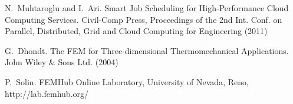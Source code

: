 
\begin{thebibliography}{10}

{\sc N.~Muhtaroglu and I.~Ari}. {Smart Job Scheduling for High-Performance Cloud Computing Services}. Civil-Comp Press, Proceedings of the 2nd Int. Conf. on
Parallel, Distributed, Grid and Cloud Computing for Engineering (2011)

{\sc G.~Dhondt}. {The FEM for Three-dimensional Thermomechanical Applications}. John Wiley \& Sons Ltd. (2004)

{\sc P.~Solin}. {FEMHub Online Laboratory, University of Nevada, Reno, http://lab.femhub.org/}
\end{thebibliography}